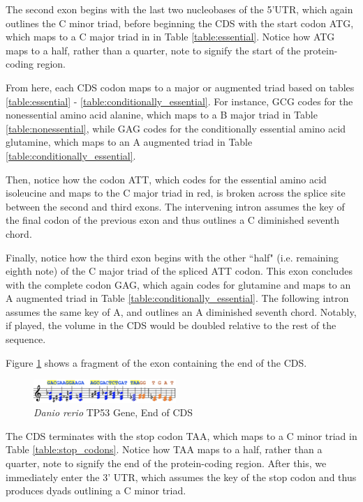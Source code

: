 \documentclass[letterpaper]{article}
\begin{document}
The second exon begins with the last two nucleobases of the 5'UTR, which again outlines the C minor triad, before beginning the CDS with the start codon ATG, which maps to a C major triad in in Table \ref{table:essential}. Notice how ATG maps to a half, rather than a quarter, note to signify the start of the protein-coding region.

From here, each CDS codon maps to a major or augmented triad based on tables \ref{table:essential} - \ref{table:conditionally_essential}. For instance, GCG codes for the nonessential amino acid alanine, which maps to a B major triad in Table \ref{table:nonessential}, while GAG codes for the conditionally essential amino acid glutamine, which maps to an A augmented triad in Table \ref{table:conditionally_essential}. 

Then, notice how the codon ATT, which codes for the essential amino acid isoleucine and maps to the C\musSharp\; major triad in red, is broken across the splice site between the second and third exons. The intervening intron assumes the key of the final codon of the previous exon and thus outlines a C\musSharp \; diminished seventh chord. 

Finally, notice how the third exon begins with the other ``half" (i.e.  remaining eighth note) of the C\musSharp\; major triad of the spliced ATT codon. This exon concludes with the complete codon GAG, which again codes for glutamine and maps to an A augmented triad in Table \ref{table:conditionally_essential}. The following intron assumes the same key of A, and outlines an A \; diminished seventh chord. Notably, if played, the volume in the CDS would be doubled relative to the rest of the sequence.

Figure \ref{fig:danio_rerio_end_translation} shows a fragment of the exon containing the end of the CDS. 

\begin{figure}[h!]
\centering
\includegraphics[width=0.48\textwidth]{images/danio_rerio_end_translation}
\vspace{-3mm}
  \caption{\textit{Danio rerio} TP53 Gene, End of CDS}
  \label{fig:danio_rerio_end_translation}
  \vspace{-3mm}
\end{figure}

The CDS terminates with the stop codon TAA, which maps to a C minor triad in Table \ref{table:stop_codons}. Notice how TAA maps to a half, rather than a quarter, note to signify the end of the protein-coding region. After this, we immediately enter the 3' UTR, which assumes the key of the stop codon and thus produces dyads outlining a C minor triad. 
\end{document}
